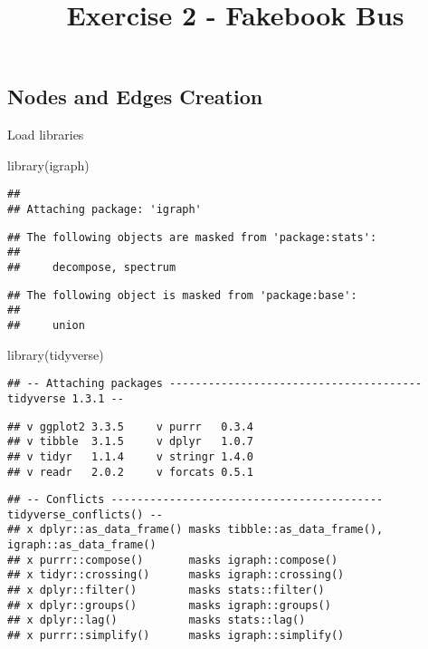 \documentclass[
]{article}
\title{Exercise 2 - Fakebook Bus}
\author{}
\date{\vspace{-2.5em}}
\newenvironment{Shaded}{\begin{snugshade}}{\end{snugshade}}
\newcommand{\FunctionTok}[1]{\textcolor[rgb]{0.00,0.00,0.00}{#1}}
\newcommand{\NormalTok}[1]{#1}
\begin{document}
\maketitle

\hypertarget{nodes-and-edges-creation}{%
\subsection{Nodes and Edges Creation}\label{nodes-and-edges-creation}}

Load libraries

\begin{Shaded}
\begin{Highlighting}[]
\FunctionTok{library}\NormalTok{(igraph)}
\end{Highlighting}
\end{Shaded}

\begin{verbatim}
## 
## Attaching package: 'igraph'
\end{verbatim}

\begin{verbatim}
## The following objects are masked from 'package:stats':
## 
##     decompose, spectrum
\end{verbatim}

\begin{verbatim}
## The following object is masked from 'package:base':
## 
##     union
\end{verbatim}

\begin{Shaded}
\begin{Highlighting}[]
\FunctionTok{library}\NormalTok{(tidyverse)}
\end{Highlighting}
\end{Shaded}

\begin{verbatim}
## -- Attaching packages --------------------------------------- tidyverse 1.3.1 --
\end{verbatim}

\begin{verbatim}
## v ggplot2 3.3.5     v purrr   0.3.4
## v tibble  3.1.5     v dplyr   1.0.7
## v tidyr   1.1.4     v stringr 1.4.0
## v readr   2.0.2     v forcats 0.5.1
\end{verbatim}

\begin{verbatim}
## -- Conflicts ------------------------------------------ tidyverse_conflicts() --
## x dplyr::as_data_frame() masks tibble::as_data_frame(), igraph::as_data_frame()
## x purrr::compose()       masks igraph::compose()
## x tidyr::crossing()      masks igraph::crossing()
## x dplyr::filter()        masks stats::filter()
## x dplyr::groups()        masks igraph::groups()
## x dplyr::lag()           masks stats::lag()
## x purrr::simplify()      masks igraph::simplify()
\end{verbatim}
\end{document}
